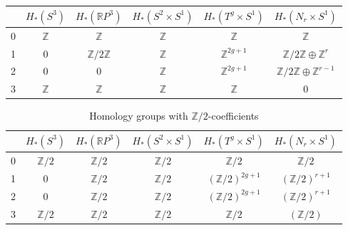 \documentclass[a4paper, 12pt]{article}
\begin{document}
\begin{solution}
\begin{enumerate}[(a)]
\begin{table}[!h]
\begin{center}
\begin{tabular}{|c||c|c|c|c|c|}
	\hline
	 & $H_*(S^3)$ & $H_*(\mathbb{R}P^3)$ & $H_*(S^2\times S^1)$ & $H_*(T^g\times S^1)$ & $ H_*(N_r\times S^1)$\\ 
	 \hline\hline
	0& $\mathbb{Z}$ & $\mathbb{Z}$ & \(\mathbb{Z}\) & \(\mathbb{Z}\) & \(\mathbb{Z}\) \\ 
	\hline
	1& \(0\) &  \(\mathbb{Z}/2 \mathbb{Z}\) & \(\mathbb{Z}\) & \(\mathbb{Z}^{2g+1}\) & \(\mathbb{Z}/2 \mathbb{Z} \oplus \mathbb{Z}^r\)\\ 
	\hline
	2& $0$   &   \(0\) & \(\mathbb{Z}\) & \(\mathbb{Z}^{2g+1}\) & \(\mathbb{Z}/2 \mathbb{Z}\oplus \mathbb{Z}^{r-1}\)\\ 
	\hline
	3& $\mathbb{Z}$ & $\mathbb{Z}$ & \(\mathbb{Z}\) & \(\mathbb{Z}\) & \(0\)\\
	\hline
\end{tabular}
\end{center}
\end{table}

\begin{table}[!h]
\begin{center}
\caption{Homology groups with \(\mathbb{Z}/2\)-coefficients}
\vspace{.1cm}
\begin{tabular}{|c||c|c|c|c|c|}
	\hline
	& $H_*(S^3)$ & $H_*(\mathbb{R}P^3)$ & $H_*(S^2\times S^1)$ & $H_*(T^g\times S^1)$ & $ H_*(N_r\times S^1)$\\ 
	\hline\hline 
	0&\(\mathbb{Z}/2\) & \(\mathbb{Z}/2\) & \(\mathbb{Z}/2\) & \(\mathbb{Z}/2\) & \(\mathbb{Z}/2\)\\ 
	\hline
	1&\(0\) & \(\mathbb{Z}/2\) & \(\mathbb{Z}/2\) & \((\mathbb{Z}/2)^{2g+1}\) & \((\mathbb{Z}/2)^{r+1}\) \\ 
	\hline
	2&\(0\) & \(\mathbb{Z}/2\) & \(\mathbb{Z}/2\) & \((\mathbb{Z}/2)^{2g+1}\) & \((\mathbb{Z}/2)^{r+1}\) \\ 
	\hline
	3&\(\mathbb{Z}/2\) & \(\mathbb{Z}/2\) & \(\mathbb{Z}/2\) & \(\mathbb{Z}/2\) & \((\mathbb{Z}/2)\) \\
	\hline
\end{tabular}
\end{center}
\end{table}


\end{enumerate}
\end{solution}
\end{document}
